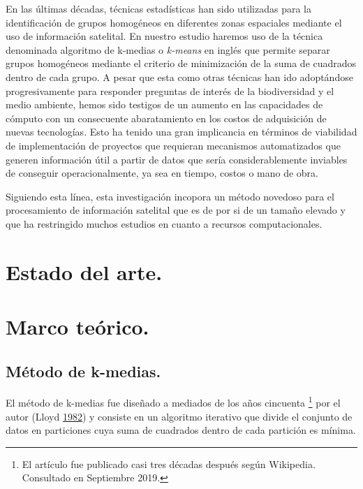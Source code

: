\documentclass[]{article}
\let\rmarkdownfootnote\footnote%
\def\footnote{\protect\rmarkdownfootnote}
\begin{document}
En las últimas décadas, técnicas estadísticas han sido utilizadas para
la identificación de grupos homogéneos en diferentes zonas espaciales
mediante el uso de información satelital. En nuestro estudio haremos uso
de la técnica denominada algoritmo de k-medias o \emph{k-means} en
inglés que permite separar grupos homogéneos mediante el criterio de
minimización de la suma de cuadrados dentro de cada grupo. A pesar que
esta como otras técnicas han ido adoptándose progresivamente para
responder preguntas de interés de la biodiversidad y el medio ambiente,
hemos sido testigos de un aumento en las capacidades de cómputo con un
consecuente abaratamiento en los costos de adquisición de nuevas
tecnologías. Esto ha tenido una gran implicancia en términos de
viabilidad de implementación de proyectos que requieran mecanismos
automatizados que generen información útil a partir de datos que sería
considerablemente inviables de conseguir operacionalmente, ya sea en
tiempo, costos o mano de obra.

Siguiendo esta línea, esta investigación incopora un método novedoso
para el procesamiento de información satelital que es de por si de un
tamaño elevado y que ha restringido muchos estudios en cuanto a recursos
computacionales.

\clearpage

\section{Estado del arte.}\label{estado-del-arte.}

\clearpage

\section{Marco teórico.}\label{marco-teorico.}

\subsection{Método de k-medias.}\label{metodo-de-k-medias.}

El método de k-medias fue diseñado a mediados de los años cincuenta
\footnote{El artículo fue publicado casi tres décadas después según Wikipedia.
Consultado en Septiembre 2019.} por el autor (Lloyd
\protect\hyperlink{ref-lloyd_least_1982}{1982}) y consiste en un
algoritmo iterativo que divide el conjunto de datos en particiones cuya
suma de cuadrados dentro de cada partición es mínima.
\end{document}
